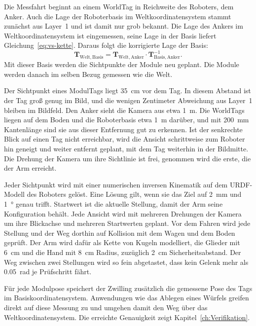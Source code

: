 Die Messfahrt beginnt an einem WorldTag in Reichweite des Roboters, dem Anker. Auch die Lage der Roboterbasis im Weltkoordinatensystem stammt zunächst aus Layer~1 und ist damit nur grob bekannt. Die Lage des Ankers im Weltkoordinatensystem ist eingemessen, seine Lage in der Basis liefert Gleichung~\eqref{eq:vs-kette}. Daraus folgt die korrigierte Lage der Basis:
\begin{equation}
    \mathbf{T}_{\mathrm{Welt,Basis}} = \mathbf{T}_{\mathrm{Welt,Anker}} \cdot \mathbf{T}_{\mathrm{Basis,Anker}}^{-1} .
    \label{eq:vs-anker}
\end{equation}
Mit dieser Basis werden die Sichtpunkte der Module neu geplant. Die Module werden danach im selben Bezug gemessen wie die Welt.

Der Sichtpunkt eines ModulTags liegt \SI{35}{\centi\metre} vor dem Tag. In diesem Abstand ist der Tag groß genug im Bild, und die wenigen Zentimeter Abweichung aus Layer~1 bleiben im Bildfeld. Den Anker sieht die Kamera aus etwa \SI{1}{\metre}. Die WorldTags liegen auf dem Boden und die Roboterbasis etwa \SI{1}{\metre} darüber, und mit \SI{200}{\milli\metre} Kantenlänge sind sie aus dieser Entfernung gut zu erkennen. Ist der senkrechte Blick auf einen Tag nicht erreichbar, wird die Ansicht schrittweise zum Roboter hin geneigt und weiter entfernt geplant, mit dem Tag weiterhin in der Bildmitte. Die Drehung der Kamera um ihre Sichtlinie ist frei, genommen wird die erste, die der Arm erreicht.

Jeder Sichtpunkt wird mit einer numerischen inversen Kinematik auf dem URDF-Modell des Roboters gelöst. Eine Lösung gilt, wenn sie das Ziel auf \SI{2}{\milli\metre} und \SI{1}{\degree} genau trifft. Startwert ist die aktuelle Stellung, damit der Arm seine Konfiguration behält. Jede Ansicht wird mit mehreren Drehungen der Kamera um ihre Blickachse und mehreren Startwerten geplant. Vor dem Fahren wird jede Stellung und der Weg dorthin auf Kollision mit dem Wagen und dem Boden geprüft. Der Arm wird dafür als Kette von Kugeln modelliert, die Glieder mit \SI{6}{\centi\metre} und die Hand mit \SI{8}{\centi\metre} Radius, zuzüglich \SI{2}{\centi\metre} Sicherheitsabstand. Der Weg zwischen zwei Stellungen wird so fein abgetastet, dass kein Gelenk mehr als \SI{0,05}{\radian} je Prüfschritt fährt. 

Für jede Modulpose speichert der Zwilling zusätzlich die gemessene Pose des Tags im Basiskoordinatensystem. Anwendungen wie das Ablegen eines Würfels greifen direkt auf diese Messung zu und umgehen damit den Weg über das Weltkoordinatensystem. Die erreichte Genauigkeit zeigt Kapitel~\ref{ch:Verifikation}. 

